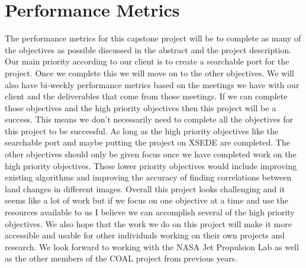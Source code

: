 \documentclass{article}
\begin{document}
\section*{Performance Metrics}
The performance metrics for this capstone project will be to complete as many
of the objectives as possible discussed in the abstract and the project
description. Our main priority according to our client is to create a
searchable port for the project. Once we complete this we will move on to the
other objectives. We will also have bi-weekly performance metrics based on the
meetings we have with our client and the deliverables that come from those
meetings. If we can complete those objectives and the high priority objectives
then this project will be a success.
\newline
This means we don't necessarily need to complete all the objectives for this
project to be successful. As long as the high priority objectives like the
searchable port and maybe putting the project on XSEDE are completed. The other
objectives should only be given focus once we have completed work on the high
priority objectives. These lower priority objectives would include improving
existing algorithms and improving the accuracy of finding correlations between
land changes in different images.
\newline
Overall this project looks challenging and it seems like a lot of work but if
we focus on one objective at a time and use the resources available to us I
believe we can accomplish several of the high priority objectives. We also hope
that the work we do on this project will make it more accessible and usable for
other individuals working on their own projects and research. We look forward
to working with the NASA Jet Propulsion Lab as well as the other members of the
COAL project from previous years.


\end{document}
